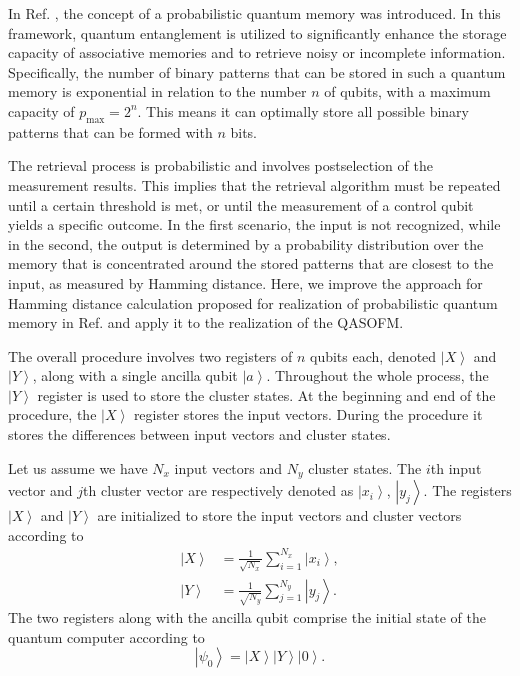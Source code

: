 \documentclass[pra,showkeys,twocolumn,showpacs,aps,10pt]{revtex4-2}
\begin{document}
In Ref. \cite{trugenberger2001}, the concept of a probabilistic quantum memory was introduced. In this framework, quantum entanglement is utilized to significantly enhance the storage capacity of associative memories and to retrieve noisy or incomplete information. Specifically, the number of binary patterns that can be stored in such a quantum memory is exponential in relation to the number $ n $ of qubits, with a maximum capacity of $ p_{\text{max}} = 2^n $. This means it can optimally store all possible binary patterns that can be formed with $ n $ bits.

The retrieval process is probabilistic and involves postselection of the measurement results. This implies that the retrieval algorithm must be repeated until a certain threshold is met, or until the measurement of a control qubit yields a specific outcome. In the first scenario, the input is not recognized, while in the second, the output is determined by a probability distribution over the memory that is concentrated around the stored patterns that are closest to the input, as measured by Hamming distance. Here, we improve the approach for Hamming distance calculation proposed for realization of probabilistic quantum memory in Ref. \cite{trugenberger2001} and apply it to the realization of the QASOFM.


The overall procedure involves two registers of $n$ qubits each, denoted $\left| X \right\rangle$ and $\left| Y \right\rangle$, along with a single ancilla qubit $\left| a \right\rangle$.
Throughout the whole process, the $\left| Y \right\rangle$ register is used to store the cluster states.
At the beginning and end of the procedure, the $\left| X \right\rangle$ register stores the input vectors.
During the procedure it stores the differences between input vectors and cluster states.

Let us assume we have $N_x$ input vectors and $N_y$ cluster states.
The $i$th input vector and $j$th cluster vector are respectively denoted as $\left| x_i \right\rangle$, $\left| y_j \right\rangle$.
The registers $\left| X \right\rangle$ and $\left| Y \right\rangle$ are initialized to store the input vectors and cluster vectors according to
%
\begin{align}
    \label{eq:encodnig}
    \left| X \right\rangle  & = \frac{1}{\sqrt{N_x}} \sum\limits_{i=1}^{N_x} \left| x_i \right\rangle,  \\
    \left| Y \right\rangle&  = \frac{1}{\sqrt{N_y}} \sum\limits_{j=1}^{N_y} \left| y_j \right\rangle .
\end{align}
%
The two registers along with the ancilla qubit comprise the initial state of the quantum computer according to
%
\begin{equation}
    \label{eq:initial_state}
  \left| \psi_0 \right\rangle =
    \left| X \right\rangle
    \left| Y \right\rangle
    \left| 0 \right\rangle.
\end{equation}
\end{document}
